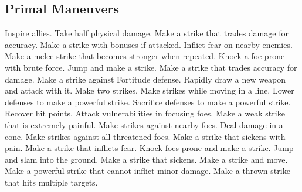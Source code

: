 \subsection{Primal Maneuvers}\label{Primal Maneuvers}
\begin{spelllist}
 Inspire allies.
 Take half physical damage.
 Make a strike that trades damage for accuracy.
 Make a strike with bonuses if attacked.
 Inflict fear on nearby enemies.
 Make a melee strike that becomes stronger when repeated.
 Knock a foe prone with brute force.
 Jump and make a strike.
 Make a strike that trades accuracy for damage.
 Make a strike against Fortitude defense.
 Rapidly draw a new weapon and attack with it.
 Make two strikes.
 Make strikes while moving in a line.
 Lower defenses to make a powerful strike.
 Sacrifice defenses to make a powerful strike.
 Recover hit points.
 Attack vulnerabilities in focusing foes.
 Make a weak strike that is extremely painful.
 Make strikes against nearby foes.
 Deal damage in a cone.
 Make strikes against all threatened foes.
 Make a strike that sickens with pain.
 Make a strike that inflicts fear.
 Knock foes prone and make a strike.
 Jump and slam into the ground.
 Make a strike that sickens.
 Make a strike and move.
 Make a powerful strike that cannot inflict minor damage.
 Make a thrown strike that hits multiple targets.
\end{spelllist}



\small
